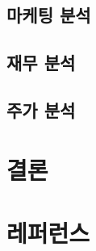 \documentclass[11pt]{oblivoir}
\begin{document}
		\subsection{마케팅 분석}
		
		\subsection{재무 분석}
		
		\subsection{주가 분석}
	
	\section{결론}
	
	\section{레퍼런스}
	
\end{document}
